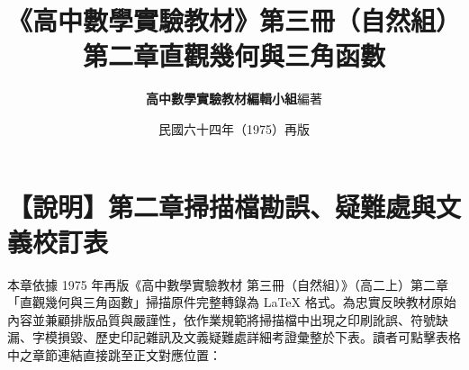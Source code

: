 \documentclass[a4paper,12pt,twoside]{article}
\title{\LARGE\textbf{《高中數學實驗教材》第三冊（自然組）}\\[0.5em] \Large\textbf{第二章\quad 直觀幾何與三角函數}}
\author{\textbf{高中數學實驗教材編輯小組}\quad 編著}
\date{民國六十四年（1975）再版}
\begin{document}
\maketitle
\thispagestyle{firstpage}

\section*{【說明】第二章掃描檔勘誤、疑難處與文義校訂表}
\label{sec:errata_notes_b3_ch2}
\label{sec:current_errata}

本章依據 1975 年再版《高中數學實驗教材 第三冊（自然組）》（高二上）第二章「直觀幾何與三角函數」掃描原件完整轉錄為 \LaTeX{} 格式。為忠實反映教材原始內容並兼顧排版品質與嚴謹性，依作業規範將掃描檔中出現之印刷訛誤、符號缺漏、字模損毀、歷史印記雜訊及文義疑難處詳細考證彙整於下表。讀者可點擊表格中之章節連結直接跳至正文對應位置：
\end{document}
